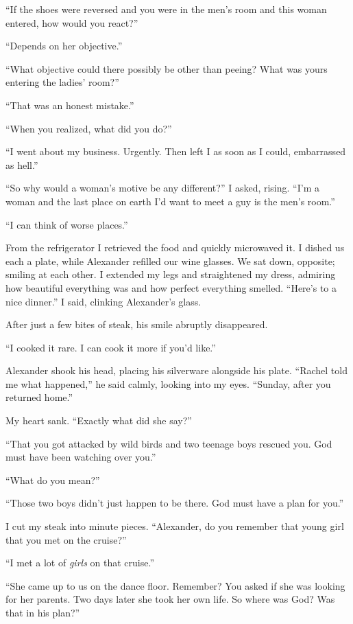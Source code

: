 ``If the shoes were reversed and you were in the men's room and this
woman entered, how would you react?''

``Depends on her objective.''

``What objective could there possibly be other than peeing? What was
yours entering the ladies' room?''

``That was an honest mistake.''

``When you realized, what did you do?''

``I went about my business. Urgently. Then left I as soon as I could,
embarrassed as hell.''

``So why would a woman's motive be any different?'' I asked, rising.
``I'm a woman and the last place on earth I'd want to meet a guy is the
men's room.''

``I can think of worse places.''

From the refrigerator I retrieved the food and quickly microwaved it. I
dished us each a plate, while Alexander refilled our wine glasses. We
sat down, opposite; smiling at each other. I extended my legs and
straightened my dress, admiring how beautiful everything was and how
perfect everything smelled. ``Here's to a nice dinner.'' I said,
clinking Alexander's glass.

After just a few bites of steak, his smile abruptly disappeared.

``I cooked it rare. I can cook it more if you'd like.''

Alexander shook his head, placing his silverware alongside his plate.
``Rachel told me what happened,'' he said calmly, looking into my eyes.
``Sunday, after you returned home.''

My heart sank. ``Exactly what did she say?''

``That you got attacked by wild birds and two teenage boys rescued you.
God must have been watching over you.''

``What do you mean?''

``Those two boys didn't just happen to be there. God must have a plan
for you.''

I cut my steak into minute pieces. ``Alexander, do you remember that
young girl that you met on the cruise?''

``I met a lot of \emph{girls} on that cruise.''

``She came up to us on the dance floor. Remember? You asked if she was
looking for her parents. Two days later she took her own life. So where
was God? Was that in his plan?''

